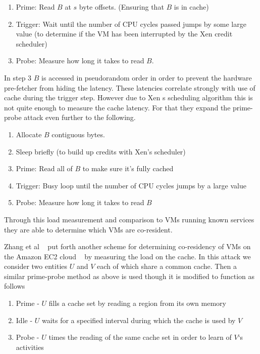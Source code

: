 \begin{enumerate}
	\item Prime: Read $B$ at $s$ byte offsets. (Ensuring that $B$ is in cache)
	\item Trigger: Wait until the number of CPU cycles passed jumps by some large value (to determine if the VM has been interrupted by the Xen credit scheduler)
	\item Probe: Measure how long it takes to read $B$.
\end{enumerate}

In step 3 $B$ is accessed in pseudorandom order in order to prevent the hardware pre-fetcher from hiding the latency. These latencies correlate strongly with use of cache during the trigger step. However due to Xen s scheduling algorithm this is not quite enough to measure the cache latency. For that they expand the prime-probe attack even further to the following.

\begin{enumerate}
	\item Allocate $B$ contiguous bytes.
	\item Sleep briefly (to build up credits with Xen's scheduler)
	\item Prime: Read all of $B$ to make sure it's fully cached
	\item Trigger: Busy loop until the number of CPU cycles jumps by a large value
	\item Probe: Measure how long it takes to read $B$
\end{enumerate}

Through this load measurement and comparison to VMs running known services they are able to determine which VMs are co-resident. 

Zhang et al ~\cite{zhang_cross-vm_2012} put forth another scheme for determining co-residency of VMs on the Amazon EC2 cloud ~\cite{_aws_EC2_2014} by measuring the load on the cache. In this attack we consider two entities $U$ and $V$ each of which share a common cache. Then a similar prime-probe method as above is used though it is modified to function as follows

\begin{enumerate}
	\item Prime - $U$ fills a cache set by reading a region from its own memory
	\item Idle - $U$ waits for a specified interval during which the cache is used by $V$
	\item Probe - $U$ times the reading of the same cache set in order to learn of $V$`s activities
\end{enumerate}


